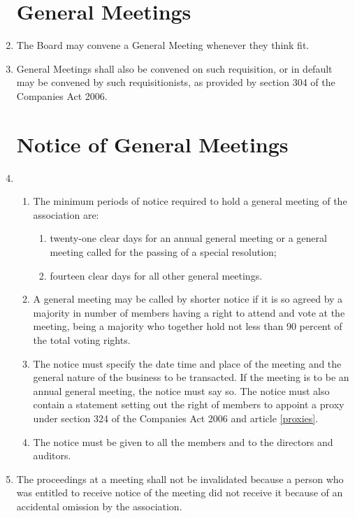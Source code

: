 \begin{enumerate}
\section{General Meetings}
\item
    The Board may convene a General Meeting whenever they think fit. 

\item 
    General Meetings shall also be convened on such requisition, or in default may be convened by such
    requisitionists, as provided by section 304 of the Companies Act 2006.

\section{Notice of General Meetings}

\item
  \begin{enumerate}
  \item
    The minimum periods of notice required to hold a general meeting of
    the association are:
    \begin{enumerate}
    \item
      twenty-one clear days for an annual general meeting or a general
      meeting called for the passing of a special resolution;
    \item
      fourteen clear days for all other general meetings.
    \end{enumerate}
  \item
    A general meeting may be called by shorter notice if it is so
    agreed by a majority in number of members having a right to attend
    and vote at the meeting, being a majority who together hold not
    less than 90 percent of the total voting rights.
  \item
    The notice must specify the date time and place of the meeting and
    the general nature of the business to be transacted. If the meeting
    is to be an annual general meeting, the notice must say so. The
    notice must also contain a statement setting out the right of
    members to appoint a proxy under section 324 of the Companies Act
    2006 and article \ref{proxies}.
  \item
    The notice must be given to all the members and to the directors
    and auditors.
  \end{enumerate}

\item
  The proceedings at a meeting shall not be invalidated because a
  person who was entitled to receive notice of the meeting did not
  receive it because of an accidental omission by the association.


\end{enumerate}
